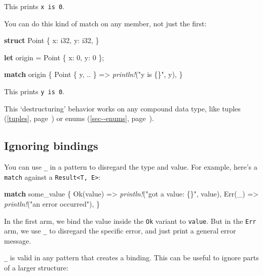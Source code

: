 \documentclass[a4paper,]{book}
\renewcommand*{\hyperref}[2][\ar]{%
  \def\ar{#2}%
  #2 (\autoref{#1}, page~\pageref{#1})}
\newenvironment{Shaded}{\begin{snugshade}}{\end{snugshade}}
\newcommand{\KeywordTok}[1]{\textcolor[rgb]{0.13,0.29,0.53}{\textbf{{#1}}}}
\newcommand{\DataTypeTok}[1]{\textcolor[rgb]{0.13,0.29,0.53}{{#1}}}
\newcommand{\DecValTok}[1]{\textcolor[rgb]{0.00,0.00,0.81}{{#1}}}
\newcommand{\ConstantTok}[1]{\textcolor[rgb]{0.00,0.00,0.00}{{#1}}}
\newcommand{\StringTok}[1]{\textcolor[rgb]{0.31,0.60,0.02}{{#1}}}
\newcommand{\PreprocessorTok}[1]{\textcolor[rgb]{0.56,0.35,0.01}{\textit{{#1}}}}
\newcommand{\NormalTok}[1]{{#1}}
\begin{document}
This prints \texttt{x\ is\ 0}.

You can do this kind of match on any member, not just the first:

\begin{Shaded}
\begin{Highlighting}[]
\KeywordTok{struct} \NormalTok{Point \{}
    \NormalTok{x: }\DataTypeTok{i32}\NormalTok{,}
    \NormalTok{y: }\DataTypeTok{i32}\NormalTok{,}
\NormalTok{\}}

\KeywordTok{let} \NormalTok{origin = Point \{ x: }\DecValTok{0}\NormalTok{, y: }\DecValTok{0} \NormalTok{\};}

\KeywordTok{match} \NormalTok{origin \{}
    \NormalTok{Point \{ y, .. \} => }\PreprocessorTok{println!}\NormalTok{(}\StringTok{"y is \{\}"}\NormalTok{, y),}
\NormalTok{\}}
\end{Highlighting}
\end{Shaded}

This prints \texttt{y\ is\ 0}.

This `destructuring' behavior works on any compound data type, like
\hyperref[tuples]{tuples} or \hyperref[sec--enums]{enums}.

\subsection{Ignoring bindings}\label{ignoring-bindings}

You can use \texttt{\_} in a pattern to disregard the type and value.
For example, here's a \texttt{match} against a
\texttt{Result\textless{}T,\ E\textgreater{}}:

\begin{Shaded}
\begin{Highlighting}[]
\KeywordTok{match} \NormalTok{some_value \{}
    \ConstantTok{Ok}\NormalTok{(value) => }\PreprocessorTok{println!}\NormalTok{(}\StringTok{"got a value: \{\}"}\NormalTok{, value),}
    \ConstantTok{Err}\NormalTok{(_) => }\PreprocessorTok{println!}\NormalTok{(}\StringTok{"an error occurred"}\NormalTok{),}
\NormalTok{\}}
\end{Highlighting}
\end{Shaded}

In the first arm, we bind the value inside the \texttt{Ok} variant to
\texttt{value}. But in the \texttt{Err} arm, we use \texttt{\_} to
disregard the specific error, and just print a general error message.

\texttt{\_} is valid in any pattern that creates a binding. This can be
useful to ignore parts of a larger structure:
\end{document}
